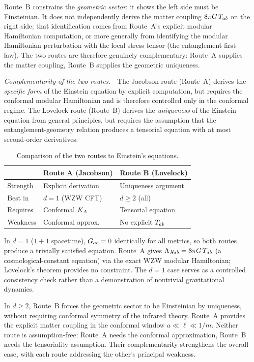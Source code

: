 Route~B constrains the \emph{geometric sector}: it shows the left side
must be Einsteinian.  It does not independently derive the matter
coupling $8\pi G\,T_{ab}$ on the right side; that identification
comes from Route~A's explicit modular Hamiltonian computation, or more
generally from identifying the modular Hamiltonian perturbation with
the local stress tensor (the entanglement first law).  The two routes
are therefore genuinely complementary: Route~A supplies the matter
coupling, Route~B supplies the geometric uniqueness.

\emph{Complementarity of the two routes.}---The Jacobson route
(Route~A) derives the \emph{specific form} of the Einstein equation by
explicit computation, but requires the conformal modular Hamiltonian
and is therefore controlled only in the conformal regime.  The Lovelock
route (Route~B) derives the \emph{uniqueness} of the Einstein equation
from general principles, but requires the assumption that the
entanglement-geometry relation produces a tensorial equation with at
most second-order derivatives.

\begin{table}
\caption{Comparison of the two routes to Einstein's equations.
\label{tab:routes}}
\begin{ruledtabular}
\begin{tabular}{lll}
  & Route A (Jacobson) & Route B (Lovelock) \\ \hline
Strength & Explicit derivation & Uniqueness argument \\
Best in & $d = 1$ (WZW CFT) & $d \geq 2$ (all) \\
Requires & Conformal $K_A$ & Tensorial equation \\
Weakness & Conformal approx.\ & No explicit $T_{ab}$ \\
\end{tabular}
\end{ruledtabular}
\end{table}

In $d = 1$ ($1{+}1$ spacetime), $G_{ab} = 0$ identically for all metrics,
so both routes produce a trivially satisfied equation. Route~A gives
$\Lambda\,g_{ab} = 8\pi G\,T_{ab}$ (a cosmological-constant equation)
via the exact WZW modular Hamiltonian; Lovelock's theorem provides no
constraint.  The $d = 1$ case serves as a controlled consistency check
rather than a demonstration of nontrivial gravitational dynamics.

In $d \geq 2$, Route~B forces the geometric sector to be Einsteinian
by uniqueness, without requiring conformal symmetry of the infrared
theory.  Route~A provides the explicit matter coupling in the conformal
window $a \ll \ell \ll 1/m$.  Neither route is assumption-free: Route~A
needs the conformal approximation, Route~B needs the tensoriality
assumption.  Their complementarity strengthens the overall case, with
each route addressing the other's principal weakness.
